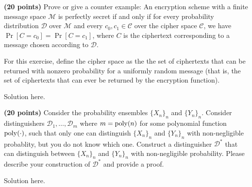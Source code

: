 \documentclass[12pt]{hw}
\begin{document}
\begin{exercise}
  \textbf{(20 points)} Prove or give a counter example: An encryption scheme with a
  finite message space $\mathcal{M}$ is perfectly secret if and only
  if for every probability distribution $\mathcal{D}$ over
  $\mathcal{M}$ and every $c_0, c_1 \in \mathcal{C}$ over the cipher
  space $\mathcal{C}$, we have $\Pr[C = c_0] = \Pr[C = c_1]$, where
  $C$ is the ciphertext corresponding to a message chosen according to
  $\mathcal{D}$.
  
  For this exercise, define the cipher space as the the set of
  ciphertexts that can be returned with nonzero probability for a
  uniformly random message (that is, the set of ciphertexts that can
  ever be returned by the encryption function).
\end{exercise}

\begin{answer}
  Solution here.
\end{answer}


\begin{exercise}
  \textbf{(20 points)} 
Consider the probability ensembles $\{X_n\}_n$ and 
$\{Y_n\}_n$. Consider distinguishers $\mathcal{D}_1, \ldots, \mathcal{D}_m$ where 
$m = \operatorname{poly}(n)$ 
for some polynomial function $\operatorname{poly}(\cdot)$, 
such that only one can distinguish $\{X_n\}_n$ and $\{Y_n\}_n$ 
with non-negligible probablity, but you do not know which one. 
Construct a distinguisher $\mathcal{D}^*$ that can distinguish between $\{X_n\}_n$ 
and $\{Y_n\}_n$ with non-negligible probability. 
Please describe your construction of $\mathcal{D}^*$ and provide a proof. 
\end{exercise}


\begin{answer}
  Solution here.

\end{answer}

\end{document}
